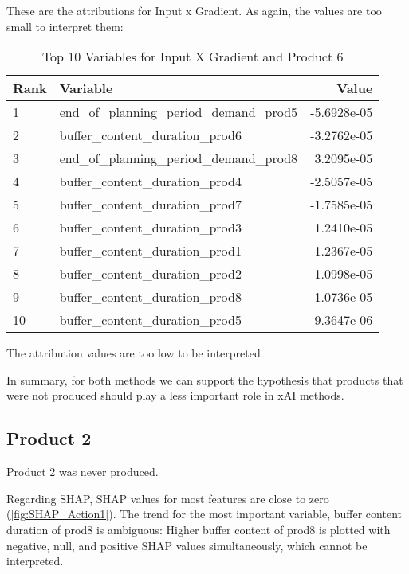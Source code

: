 These are the attributions for Input x Gradient. As again, the values are too small to interpret them:

\begin{table}[ht!]
    \footnotesize
    \centering
    \caption{Top 10 Variables for Input X Gradient and Product 6}
    \label{tab:top_variables_target5}
    \begin{tabularx}{\textwidth}{lXr}
        \toprule
        \textbf{Rank} & \textbf{Variable}                        & \textbf{Value} \\
        \midrule
        1             & end\_of\_planning\_period\_demand\_prod5 & -5.6928e-05    \\
        2             & buffer\_content\_duration\_prod6         & -3.2762e-05    \\
        3             & end\_of\_planning\_period\_demand\_prod8 & 3.2095e-05     \\
        4             & buffer\_content\_duration\_prod4         & -2.5057e-05    \\
        5             & buffer\_content\_duration\_prod7         & -1.7585e-05    \\
        6             & buffer\_content\_duration\_prod3         & 1.2410e-05     \\
        7             & buffer\_content\_duration\_prod1         & 1.2367e-05     \\
        8             & buffer\_content\_duration\_prod2         & 1.0998e-05     \\
        9             & buffer\_content\_duration\_prod8         & -1.0736e-05    \\
        10            & buffer\_content\_duration\_prod5         & -9.3647e-06    \\
        \bottomrule
    \end{tabularx}
\end{table}
\FloatBarrier

The attribution values are too low to be interpreted.

In summary, for both methods we can support the hypothesis that products that were not produced should play a less important role in xAI methods.

\subsection{Product 2}

Product 2 was never produced.

Regarding SHAP, SHAP values for most features are close to zero (\ref{fig:SHAP_Action1}). The trend for the most important variable, buffer content duration of prod8 is ambiguous: Higher buffer content of prod8 is plotted with negative, null, and positive SHAP values simultaneously, which cannot be interpreted.


